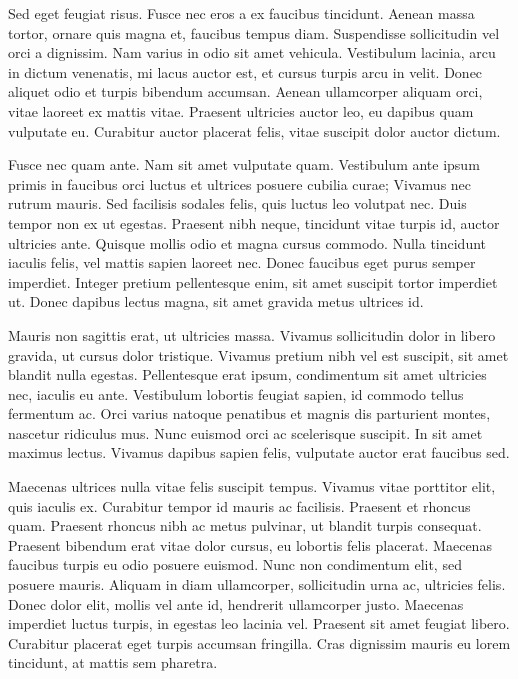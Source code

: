 \documentclass[a4paper,12pt]{article}
\begin{document}
	Sed eget feugiat risus. Fusce nec eros a ex faucibus tincidunt. Aenean massa tortor, ornare quis magna et, faucibus tempus diam. Suspendisse sollicitudin vel orci a dignissim. Nam varius in odio sit amet vehicula. Vestibulum lacinia, arcu in dictum venenatis, mi lacus auctor est, et cursus turpis arcu in velit. Donec aliquet odio et turpis bibendum accumsan. Aenean ullamcorper aliquam orci, vitae laoreet ex mattis vitae. Praesent ultricies auctor leo, eu dapibus quam vulputate eu. Curabitur auctor placerat felis, vitae suscipit dolor auctor dictum.

	Fusce nec quam ante. Nam sit amet vulputate quam. Vestibulum ante ipsum primis in faucibus orci luctus et ultrices posuere cubilia curae; Vivamus nec rutrum mauris. Sed facilisis sodales felis, quis luctus leo volutpat nec. Duis tempor non ex ut egestas. Praesent nibh neque, tincidunt vitae turpis id, auctor ultricies ante. Quisque mollis odio et magna cursus commodo. Nulla tincidunt iaculis felis, vel mattis sapien laoreet nec. Donec faucibus eget purus semper imperdiet. Integer pretium pellentesque enim, sit amet suscipit tortor imperdiet ut. Donec dapibus lectus magna, sit amet gravida metus ultrices id.

	Mauris non sagittis erat, ut ultricies massa. Vivamus sollicitudin dolor in libero gravida, ut cursus dolor tristique. Vivamus pretium nibh vel est suscipit, sit amet blandit nulla egestas. Pellentesque erat ipsum, condimentum sit amet ultricies nec, iaculis eu ante. Vestibulum lobortis feugiat sapien, id commodo tellus fermentum ac. Orci varius natoque penatibus et magnis dis parturient montes, nascetur ridiculus mus. Nunc euismod orci ac scelerisque suscipit. In sit amet maximus lectus. Vivamus dapibus sapien felis, vulputate auctor erat faucibus sed.

	Maecenas ultrices nulla vitae felis suscipit tempus. Vivamus vitae porttitor elit, quis iaculis ex. Curabitur tempor id mauris ac facilisis. Praesent et rhoncus quam. Praesent rhoncus nibh ac metus pulvinar, ut blandit turpis consequat. Praesent bibendum erat vitae dolor cursus, eu lobortis felis placerat. Maecenas faucibus turpis eu odio posuere euismod. Nunc non condimentum elit, sed posuere mauris. Aliquam in diam ullamcorper, sollicitudin urna ac, ultricies felis. Donec dolor elit, mollis vel ante id, hendrerit ullamcorper justo. Maecenas imperdiet luctus turpis, in egestas leo lacinia vel. Praesent sit amet feugiat libero. Curabitur placerat eget turpis accumsan fringilla. Cras dignissim mauris eu lorem tincidunt, at mattis sem pharetra. 
\end{document}
